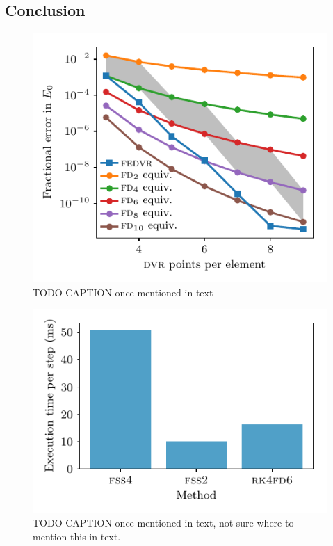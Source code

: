 \subsection{Conclusion}

\begin{figure}[t]
    \centerfloat
    \includegraphics{figures/numerics/fedvr_vs_fd_harmonic_groundstate.pdf}
    \caption{TODO CAPTION once mentioned in text}
    \label{fig:fedvr_vs_fd_harmonic_groundstate}
\end{figure}

\begin{figure}[t]
    \centerfloat
    \includegraphics{figures/numerics/method_speeds.pdf}
    \caption{TODO CAPTION once mentioned in text, not sure where to mention this in-text.}
    \label{fig:method_speeds}
\end{figure}

